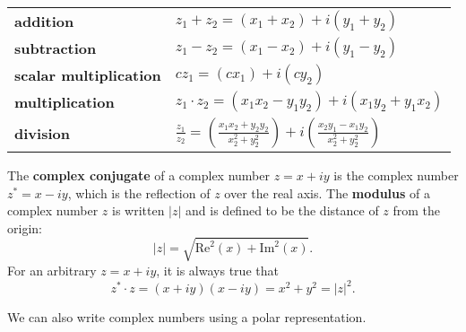 
\begin{center}
\def\arraystretch{1.4}
\begin{tabular}{@{}ll@{}}
\toprule[0.4mm]
\textbf{addition} & $z_1+ z_2=(x_1+ x_2)+i(y_1+ y_2)$\\
\textbf{subtraction} & $z_1- z_2=(x_1- x_2)+i(y_1- y_2)$\\
\textbf{scalar multiplication} & $c z_1=(cx_1)+i(cy_2)$\\
\textbf{multiplication} & $z_1 \cdot z_2=(x_1x_2- y_1y_2)+i(x_1y_2+y_1x_2)$\\
\textbf{division} & $\displaystyle\frac{z_1}{z_2}=\left(\frac{x_1x_2+y_2y_2}{x_2^2+y_2^2}\right)+i\left(\frac{x_2y_1-x_1y_2}{x_2^2+y_2^2}\right)$\\
\bottomrule[0.4mm]
\end{tabular}
\end{center}

The \textbf{complex conjugate} of a complex number $z=x+iy$ is the complex number $z^*=x-iy$, which is the reflection of $z$ over the real axis. The \textbf{modulus} of a complex number $z$ is written $|z|$ and is defined to be the distance of $z$ from the origin:
$$|z|=\sqrt{\text{Re}^2(x)+\text{Im}^2(x)}.$$
For an arbitrary $z=x+iy$, it is always true that
$$z^*\cdot z =(x+iy)(x-iy) = x^2+y^2=|z|^2.$$

We can also write complex numbers using a polar representation.


